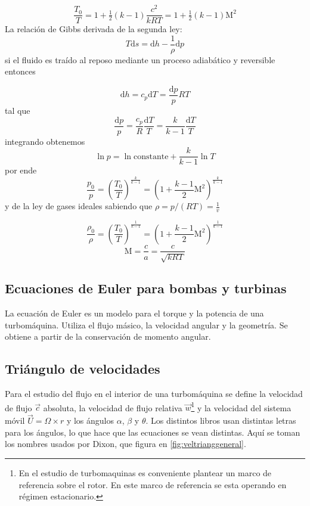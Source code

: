 \documentclass{article}
\newcommand{\cp}{c_p}
\newcommand{\Rconst}{R}
\newcommand{\gasconst}{k}
\newcommand{\speedsound}{a}
\newcommand{\Mach}{\textrm{M}}
\newcommand{\di}{\textrm{d}}
\newcommand{\cte}{\textrm{constante}}
\begin{document}
\begin{equation}\label{eq:tempstagnation}
 \frac{T_0}{T}=1+\tfrac{1}{2}(\gasconst-1)\frac{c^2}{\gasconst\Rconst T}=1+\tfrac{1}{2}(\gasconst-1)\Mach^2
\end{equation}
La relación de Gibbs derivada de la segunda ley:
\[T\di s = \di h - \frac{1}{\rho}\di p
\]
si el fluido es traído al reposo mediante un proceso adiabático y reversible entonces

\[\di h = \cp \di T =\frac{\di p}{p}\Rconst T
\]
tal que
\[
\frac{\di p}{p} = \frac{\cp}{\Rconst}\frac{\di T}{T} = \frac{\gasconst}{\gasconst-1}\frac{\di T}{T}
\]
integrando obtenemos
\[
\ln p = \ln \cte + \frac{\gasconst}{\gasconst-1}\ln T
\]
por ende
\begin{equation}
    \frac{p_0}{p}=\left(\frac{T_0}{T} \right)^{\frac{\gasconst}{\gasconst-1}} =\left(1+ \frac{\gasconst-1}{2}\Mach^2 \right)^{\frac{\gasconst}{\gasconst-1}}
\end{equation}
y de la ley de gases ideales sabiendo que \(\rho = p/(RT)=\frac{1}{v} \)


\begin{equation}
    \frac{\rho_0}{\rho}=\left(\frac{T_0}{T} \right)^{\frac{1}{\gasconst-1}} =\left(1+ \frac{\gasconst-1}{2}\Mach^2 \right)^{\frac{1}{\gasconst-1}}
\end{equation}
\[
\Mach=\frac{c}{\speedsound} = \frac{c}{\sqrt{\gasconst \Rconst T}}
\]
\subsection{Ecuaciones de Euler para bombas y turbinas}

La ecuación de Euler es un modelo para el torque y la potencia de una turbomáquina. Utiliza el flujo másico, la velocidad angular y la geometría. Se obtiene a partir de la conservación de momento angular. 

\subsection*{Triángulo de velocidades} Para el estudio del flujo en el interior de una turbomáquina se define la velocidad de flujo $\Vec{c}$ absoluta, la velocidad de flujo relativa $\Vec{w}$\footnote{En el estudio de turbomaquinas es conveniente plantear un marco de referencia sobre el rotor. En este marco de referencia se esta operando en régimen estacionario.} y la velocidad del sistema móvil $\Vec{U}=\Omega \times r$ y los ángulos $\alpha$, $\beta$ y $\theta$. Los distintos libros usan distintas letras para los ángulos, lo que hace que las ecuaciones se vean distintas. Aquí se toman los nombres usados por Dixon, que figura en \ref{fig:veltrianggeneral}. 
\end{document}
